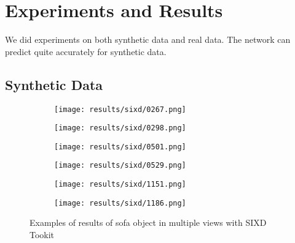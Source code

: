 \chapter{Experiments and Results}

We did experiments on both synthetic data and real data. The network can predict quite accurately for synthetic data. 
\section{Synthetic Data}

\begin{figure}[h!]
  \centering
  \begin{subfigure}[b]{0.32\linewidth}
    \texttt{[image: results/sixd/0267.png]}
  \end{subfigure}
  \begin{subfigure}[b]{0.32\linewidth}
    \texttt{[image: results/sixd/0298.png]}
  \end{subfigure}
  \begin{subfigure}[b]{0.32\linewidth}
    \texttt{[image: results/sixd/0501.png]}
  \end{subfigure}
  \begin{subfigure}[b]{0.32\linewidth}
    \texttt{[image: results/sixd/0529.png]}
  \end{subfigure}
  \begin{subfigure}[b]{0.32\linewidth}
    \texttt{[image: results/sixd/1151.png]}
  \end{subfigure}
  \begin{subfigure}[b]{0.32\linewidth}
    \texttt{[image: results/sixd/1186.png]}
  \end{subfigure}
  \caption{Examples of results of sofa object in multiple views with SIXD Tookit}
  \label{fig:sixd}
\end{figure}

